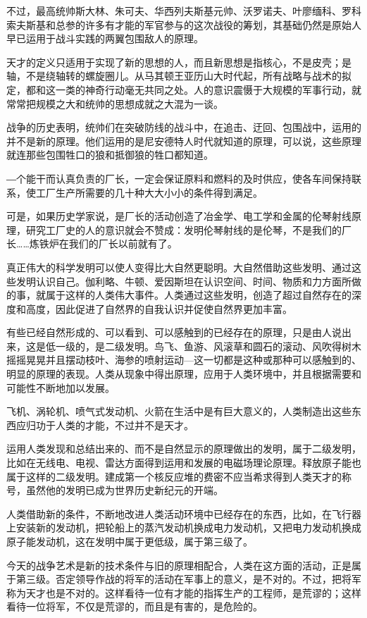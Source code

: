 不过，最高统帅斯大林、朱可夫、华西列夫斯基元帅、沃罗诺夫、叶廖缅科、罗科索夫斯基和总参的许多有才能的军官参与的这次战役的筹划，其基础仍然是原始人早已运用于战斗实践的两翼包围敌人的原理。

天才的定义只适用于实现了新的思想的人，而且新思想是指核心，不是皮壳；是轴，不是绕轴转的螺旋圈儿。从马其顿王亚历山大时代起，所有战略与战术的拟定，都和这一类的神奇行动毫无共同之处。人的意识震慑于大规模的军事行动，就常常把规模之大和统帅的思想成就之大混为一谈。

战争的历史表明，统帅们在突破防线的战斗中，在追击、迂回、包围战中，运用的并不是新的原理。他们运用的是尼安德特人时代就知道的原理，可以说，这些原理就连那些包围牲口的狼和抵御狼的牲口都知道。

―个能干而认真负责的厂长，一定会保证原料和燃料的及时供应，使各车间保持联系，使工厂生产所需要的几十种大大小小的条件得到满足。

可是，如果历史学家说，是厂长的活动创造了冶金学、电工学和金属的伦琴射线原理，研究工厂史的人的意识就会不赞成：发明伦琴射线的是伦琴，不是我们的厂长……炼铁炉在我们的厂长以前就有了。

真正伟大的科学发明可以使人变得比大自然更聪明。大自然借助这些发明、通过这些发明认识自己。伽利略、牛顿、爱因斯坦在认识空间、时间、物质和力方面所做的事，就属于这样的人类伟大事件。人类通过这些发明，创造了超过自然存在的深度和高度，因此促进了自然界的自我认识并促使自然界更加丰富。

有些已经自然形成的、可以看到、可以感触到的已经存在的原理，只是由人说出来，这是低一级的，是二级发明。鸟飞、鱼游、风滚草和圆石的滚动、风吹得树木摇摇晃晃并且摆动枝叶、海参的喷射运动—这一切都是这种或那种可以感触到的、明显的原理的表现。人类从现象中得出原理，应用于人类环境中，并且根据需要和可能性不断地加以发展。

飞机、涡轮机、喷气式发动机、火箭在生活中是有巨大意义的，人类制造出这些东西应归功于人类的才能，不过并不是天才。

运用人类发现和总结出来的、而不是自然显示的原理做出的发明，属于二级发明，比如在无线电、电视、雷达方面得到运用和发展的电磁场理论原理。释放原子能也属于这样的二级发明。建成第一个核反应堆的费密不应当希求得到人类天才的称号，虽然他的发明已成为世界历史新纪元的开端。

人类借助新的条件，不断地改进人类活动环境中已经存在的东西，比如，在飞行器上安装新的发动机，把轮船上的蒸汽发动机换成电力发动机，又把电力发动机换成原子能发动机，这在发明中属于更低级，属于第三级了。

今天的战争艺术是新的技术条件与旧的原理相配合，人类在这方面的活动，正是属于第三级。否定领导作战的将军的活动在军事上的意义，是不对的。不过，把将军称为天才也是不对的。这样看待一位有才能的指挥生产的工程师，是荒谬的；这样看待一位将军，不仅是荒谬的，而且是有害的，是危险的。

